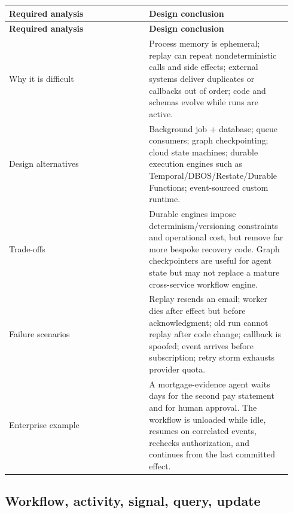 \BookTableStart
\small
\begin{longtable}{@{}Y{0.4700\linewidth}Y{0.4700\linewidth}@{}}
\color{white}\bfseries \textbf{Required analysis} & \color{white}\bfseries \textbf{Design conclusion} \\
\endfirsthead
{}
\color{white}\bfseries \textbf{Required analysis} & \color{white}\bfseries \textbf{Design conclusion} \\
\endhead
Why it is difficult & Process memory is ephemeral; replay can repeat nondeterministic calls and side effects; external systems deliver duplicates or callbacks out of order; code and schemas evolve while runs are active. \\
Design alternatives & Background job + database; queue consumers; graph checkpointing; cloud state machines; durable execution engines such as Temporal/DBOS/Restate/Durable Functions; event-sourced custom runtime. \\
Trade-offs & Durable engines impose determinism/versioning constraints and operational cost, but remove far more bespoke recovery code. Graph checkpointers are useful for agent state but may not replace a mature cross-service workflow engine. \\
Failure scenarios & Replay resends an email; worker dies after effect but before acknowledgment; old run cannot replay after code change; callback is spoofed; event arrives before subscription; retry storm exhausts provider quota. \\
Enterprise example & A mortgage-evidence agent waits days for the second pay statement and for human approval. The workflow is unloaded while idle, resumes on correlated events, rechecks authorization, and continues from the last committed effect. \\
\end{longtable}
\BookTableEnd

\subsection{Workflow, activity, signal, query, update}

